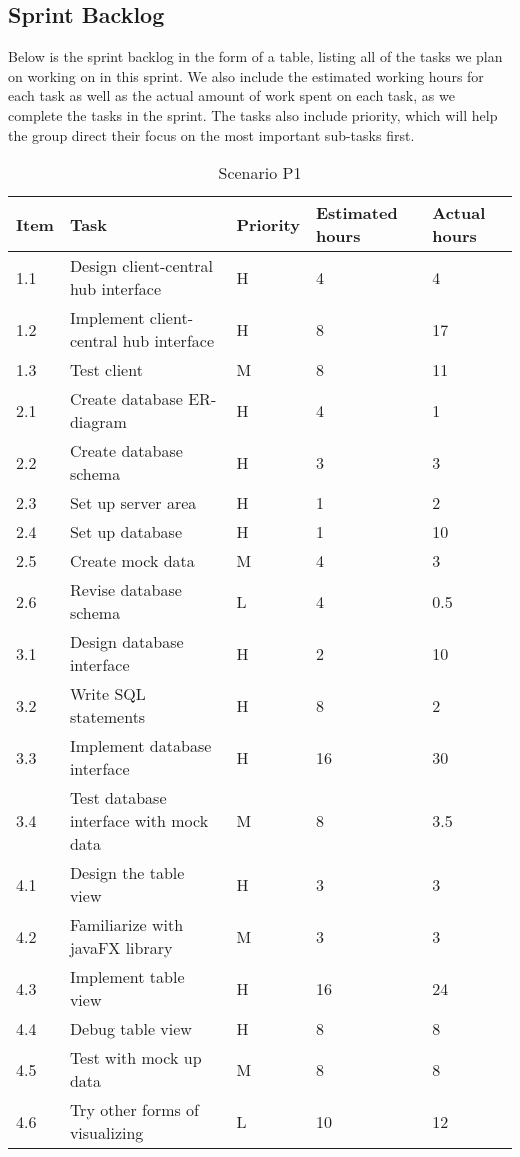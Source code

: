 \documentclass[../document.tex]{subfiles}
\begin{document}
\subsection{Sprint Backlog}
Below is the sprint backlog in the form of a table, listing all of the tasks we plan on working on in this sprint. We also include the estimated working hours for each task as well as the actual amount of work spent on each task, as we complete the tasks in the sprint. The tasks also include priority, which will help the group direct their focus on the most important sub-tasks first.


\begin{table}[H]
\caption{Scenario P1}
\begin{tabularx}{\textwidth}{|l|X|l|l|l|}
\hline
Item
&Task
&Priority
&Estimated hours
&Actual hours
\\ \hline1.1
&Design client-central hub interface
&H
&4
&4
\\ \hline1.2
&Implement client-central hub interface
&H
&8
&17
\\ \hline1.3
&Test client
&M
&8
&11
\\ \hline2.1
&Create database ER-diagram
&H
&4
&1
\\ \hline2.2
&Create database schema
&H
&3
&3
\\ \hline2.3
&Set up server area
&H
&1
&2
\\ \hline2.4
&Set up database
&H
&1
&10
\\ \hline2.5
&Create mock data
&M
&4
&3
\\ \hline2.6
&Revise database schema
&L
&4
&0.5
\\ \hline3.1
&Design database interface
&H
&2
&10
\\ \hline3.2
&Write SQL statements
&H
&8
&2
\\ \hline3.3
&Implement database interface
&H
&16
&30
\\ \hline3.4
&Test database interface with mock data
&M
&8
&3.5
\\ \hline4.1
&Design the table view
&H
&3
&3
\\ \hline4.2
&Familiarize with javaFX library
&M
&3
&3
\\ \hline4.3
&Implement table view
&H
&16
&24
\\ \hline4.4
&Debug table view
&H
&8
&8
\\ \hline4.5
&Test with mock up data
&M
&8
&8
\\ \hline4.6
&Try other forms of visualizing
&L
&10
&12
\\ \hline
\end{tabularx}
\end{table}
\end{document}
